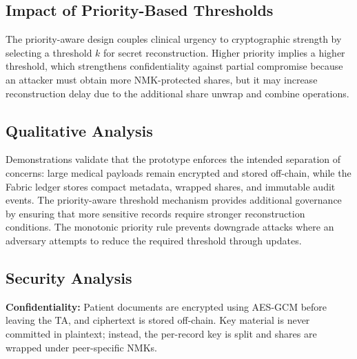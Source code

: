 \documentclass{IEEEtran}
\begin{document}
\subsection{Impact of Priority-Based Thresholds}
The priority-aware design couples clinical urgency to cryptographic strength by selecting a threshold $k$ for secret reconstruction. Higher priority implies a higher threshold, which strengthens confidentiality against partial compromise because an attacker must obtain more NMK-protected shares, but it may increase reconstruction delay due to the additional share unwrap and combine operations.

\begin{table}[!t]
\caption{Priority Impact on Threshold and Reconstruction}
\label{tab:priorityimpact}
\centering
\footnotesize
\setlength{\tabcolsep}{3pt}
\end{table}

\subsection{Qualitative Analysis}
Demonstrations validate that the prototype enforces the intended separation of concerns: large medical payloads remain encrypted and stored off-chain, while the Fabric ledger stores compact metadata, wrapped shares, and immutable audit events. The priority-aware threshold mechanism provides additional governance by ensuring that more sensitive records require stronger reconstruction conditions. The monotonic priority rule prevents downgrade attacks where an adversary attempts to reduce the required threshold through updates.

\subsection{Security Analysis}
\textbf{Confidentiality:} Patient documents are encrypted using AES-GCM before leaving the TA, and ciphertext is stored off-chain. Key material is never committed in plaintext; instead, the per-record key is split and shares are wrapped under peer-specific NMKs.
\end{document}
